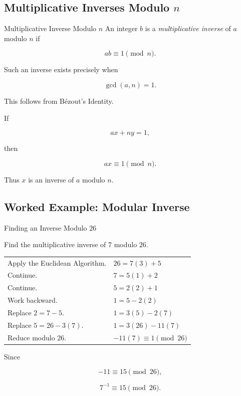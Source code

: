 \subsection{Multiplicative Inverses Modulo \(n\)}
\label{subsec:modular-inverses}

\begin{definitionbox}{Multiplicative Inverse Modulo \(n\)}
An integer \(b\) is a \emph{multiplicative inverse} of \(a\) modulo \(n\) if

\[ ab\equiv1\pmod n. \]
\end{definitionbox}

Such an inverse exists precisely when

\[ \boxed{\gcd(a,n)=1.} \]

This follows from Bézout's Identity.

If

\[ ax+ny=1, \]

then

\[ ax\equiv1\pmod n. \]

Thus \(x\) is an inverse of \(a\) modulo \(n\).

\subsection{Worked Example: Modular Inverse}
\label{subsec:worked-modular-inverse}

\begin{workedexamplebox}{Finding an Inverse Modulo \(26\)}

Find the multiplicative inverse of \(7\) modulo \(26\).

\begin{tabularx}{\textwidth}{@{}>{\raggedright\arraybackslash}p{}X@{}}
Apply the Euclidean Algorithm. &
\(26=7(3)+5\)\\
Continue. &
\(7=5(1)+2\)\\
Continue. &
\(5=2(2)+1\)\\
Work backward. &
\(1=5-2(2)\)\\
Replace \(2=7-5\). &
\(1=3(5)-2(7)\)\\
Replace \(5=26-3(7)\). &
\(1=3(26)-11(7)\)\\
Reduce modulo \(26\). &
\(-11(7)\equiv1\pmod{26}\)
\end{tabularx}

Since

\[ -11\equiv15\pmod{26}, \]

\begin{answerbox}
\[ \boxed{7^{-1}\equiv15\pmod{26}.} \]
\end{answerbox}
\end{workedexamplebox}

